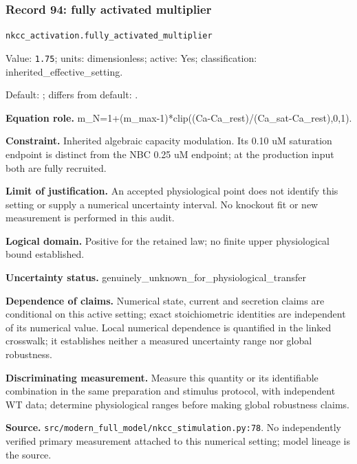 \subsubsection*{Record 94: fully activated multiplier}
{\small \nolinkurl{nkcc_activation.fully_activated_multiplier}\par

Value: \texttt{1.75}; units: dimensionless; active: Yes; classification: inherited\_effective\_setting.\par

Default: ; differs from default: .\par

\textbf{Equation role.} m\_N=1+(m\_max-1)*clip((Ca-Ca\_rest)/(Ca\_sat-Ca\_rest),0,1).\par

\textbf{Constraint.} Inherited algebraic capacity modulation. Its 0.10 uM saturation endpoint is distinct from the NBC 0.25 uM endpoint; at the production input both are fully recruited.\par

\textbf{Limit of justification.} An accepted physiological point does not identify this setting or supply a numerical uncertainty interval. No knockout fit or new measurement is performed in this audit.\par

\textbf{Logical domain.} Positive for the retained law; no finite upper physiological bound established.\par

\textbf{Uncertainty status.} genuinely\_unknown\_for\_physiological\_transfer\par

\textbf{Dependence of claims.} Numerical state, current and secretion claims are conditional on this active setting; exact stoichiometric identities are independent of its numerical value. Local numerical dependence is quantified in the linked crosswalk; it establishes neither a measured uncertainty range nor global robustness.\par

\textbf{Discriminating measurement.} Measure this quantity or its identifiable combination in the same preparation and stimulus protocol, with independent WT data; determine physiological ranges before making global robustness claims.\par

\textbf{Source.} \nolinkurl{src/modern_full_model/nkcc_stimulation.py:78}. No independently verified primary measurement attached to this numerical setting; model lineage is the source.\par}

